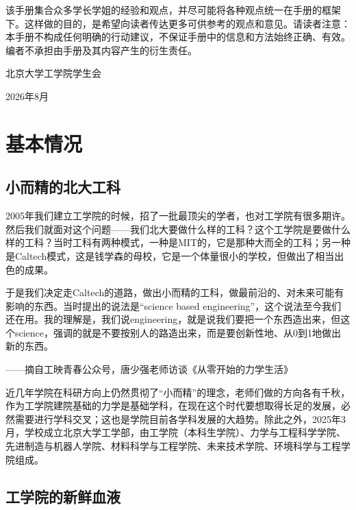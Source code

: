 \documentclass[11pt,oneside]{book}
\begin{document}
\vspace{10pt}

该手册集合众多学长学姐的经验和观点，并尽可能将各种观点统一在手册的框架下。这样做的目的，是希望向读者传达更多可供参考的观点和意见。请读者注意：本手册不构成任何明确的行动建议，不保证手册中的信息和方法始终正确、有效。编者不承担由手册及其内容产生的衍生责任。
\begin{flushright}
	北京大学工学院学生会
	
	2026年8月
\end{flushright}

\tableofcontents

\mainmatter
	
\chapter{基本情况}
\section{小而精的北大工科}
2005年我们建立工学院的时候，招了一批最顶尖的学者，也对工学院有很多期许。然后我们就面对这个问题——我们北大要做什么样的工科？这个工学院是要做什么样的工科？当时工科有两种模式，一种是MIT的，它是那种大而全的工科；另一种是Caltech模式，这是钱学森的母校，它是一个体量很小的学校，但做出了相当出色的成果。

于是我们决定走Caltech的道路，做出小而精的工科，做最前沿的、对未来可能有影响的东西。当时提出的说法是“science based engineering”，这个说法至今我们还在用。我的理解是，我们说engineering，就是说我们要把一个东西造出来，但这个science，强调的就是不要按别人的路造出来，而是要创新性地、从0到1地做出新的东西。
\begin{flushright}
	——摘自工映青春公众号，唐少强老师访谈《从零开始的力学生活》

\end{flushright}

\vspace{10pt}

近几年学院在科研方向上仍然贯彻了“小而精”的理念，老师们做的方向各有千秋，作为工学院建院基础的力学是基础学科，在现在这个时代要想取得长足的发展，必然需要进行学科交叉；这也是学院目前各学科发展的大趋势。除此之外，2025年3月，学校成立北京大学工学部，由工学院（本科生学院）、力学与工程科学学院、先进制造与机器人学院、材料科学与工程学院、未来技术学院、环境科学与工程学院组成。

\section{工学院的新鲜血液}    
\end{document}
